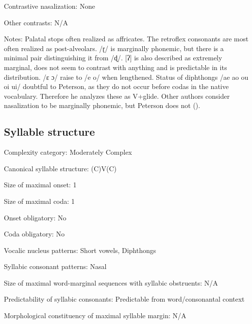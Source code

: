 {\begin{appendixdesc}
\item[Contrastive nasalization:] None

\item[Other contrasts:] N/A

\item[Notes:] Palatal stops often realized as affricates. The retroflex consonants are most often realized as post-alveolars. /ɽ/ is marginally phonemic, but there is a minimal pair distinguishing it from /ɖ/. [ʔ] is also described as extremely marginal, does not seem to contrast with anything and is predictable in its distribution. /ɛ ɔ/ raise to /e o/ when lengthened. Status of diphthongs /ae ao ou oi ui/ doubtful to Peterson, as they do not occur before codas in the native vocabulary. Therefore he analyzes these as V+glide. Other authors consider nasalization to be marginally phonemic, but Peterson does not (\citeyear[27]{Peterson2011}).
\end{appendixdesc}
\subsection*{Syllable structure}
\begin{appendixdesc}

\item[Complexity category:] Moderately Complex

\item[Canonical syllable structure:] (C)V(C) \citep[32--33]{Peterson2011}

\item[Size of maximal onset:] 1

\item[Size of maximal coda:] 1

\item[Onset obligatory:] No

\item[Coda obligatory:] No

\item[Vocalic nucleus patterns:] Short vowels, Diphthongs

\item[Syllabic consonant patterns:] Nasal

\item[Size of maximal word-marginal sequences with syllabic obstruents:] N/A

\item[Predictability of syllabic consonants:] Predictable from word/consonantal context

\item[Morphological constituency of maximal syllable margin:] N/A


\end{appendixdesc}}
